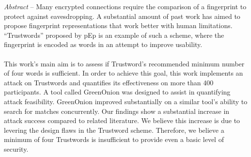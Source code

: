 \emph{Abstract} -- Many encrypted connections require the comparison of a fingerprint to
protect against eavesdropping. A substantial amount of past work has
aimed to propose fingerprint representations that work better with human limitations. ``Trustwords'' proposed by pEp is an example of such a
scheme, where the fingerprint is encoded as words in an attempt to improve
usability.
\\\\
This work's main aim is to assess if Trustword’s recommended minimum
number of four words is sufficient. In order to achieve this goal, this work
implements an attack on Trustwords and quantifies its effectiveness on
more than 400 participants. A tool called GreenOnion was designed to
assist in quantifying attack feasibility. GreenOnion improved substantially
on a similar tool’s ability to search for matches concurrently. Our findings show a
substantial increase in attack success compared to related literature. We
believe this increase is due to levering the design flaws in the Trustword
scheme. Therefore, we believe a minimum of four Trustwords is insufficient
to provide even a basic level of security.